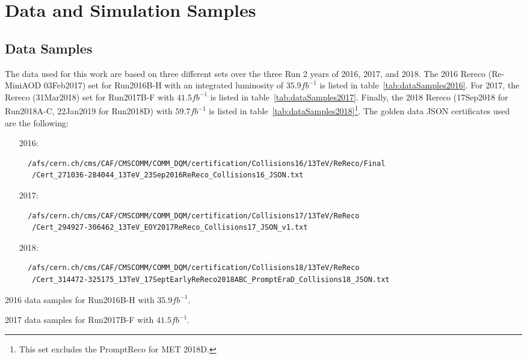 
\chapter{Data and Simulation Samples}
\label{chap:appendixSamples}

\section{Data Samples}

The data used for this work are based on three different sets over the three Run 2 years of 2016, 2017, and 2018.
The 2016 Rereco (Re-MiniAOD 03Feb2017) set for Run2016B-H with an integrated luminosity of $35.9\unit{fb^{-1}}$ is listed in table~\ref{tab:dataSamples2016}.
For 2017, the Rereco (31Mar2018) set for Run2017B-F with $41.5\unit{fb^{-1}}$ is listed in table~\ref{tab:dataSamples2017}.
Finally, the 2018 Rereco (17Sep2018 for Run2018A-C, 22Jan2019 for Run2018D) with $59.7\unit{fb^{-1}}$ is listed in table~\ref{tab:dataSamples2018}\footnote{This set excludes the PromptReco for MET 2018D.}.
The golden data JSON certificates used are the following:
\begin{itemize}
  \item[2016:]
  \begingroup
  \fontsize{9pt}{12pt}
  \begin{verbatim}
  /afs/cern.ch/cms/CAF/CMSCOMM/COMM_DQM/certification/Collisions16/13TeV/ReReco/Final
   /Cert_271036-284044_13TeV_23Sep2016ReReco_Collisions16_JSON.txt
  \end{verbatim}
  \endgroup
  \item[2017:]
  \begingroup
  \fontsize{9pt}{12pt}
  \begin{verbatim}
  /afs/cern.ch/cms/CAF/CMSCOMM/COMM_DQM/certification/Collisions17/13TeV/ReReco
   /Cert_294927-306462_13TeV_EOY2017ReReco_Collisions17_JSON_v1.txt
  \end{verbatim}
  \endgroup
  \item[2018:]
  \begingroup
  \fontsize{9pt}{12pt}
  \begin{verbatim}
  /afs/cern.ch/cms/CAF/CMSCOMM/COMM_DQM/certification/Collisions18/13TeV/ReReco
   /Cert_314472-325175_13TeV_17SeptEarlyReReco2018ABC_PromptEraD_Collisions18_JSON.txt
  \end{verbatim}
  \endgroup
\end{itemize}

\begin{table}[htbp]
  \centering
  
  \caption{
    2016 data samples for Run2016B-H with $35.9\unit{fb^{-1}}$.
  }
  \label{tab:dataSamples2016}
\end{table}
\begin{table}[htbp]
  \centering
  
  \caption{
    2017 data samples for Run2017B-F with $41.5\unit{fb^{-1}}$.
  }
  \label{tab:dataSamples2017}
\end{table}

